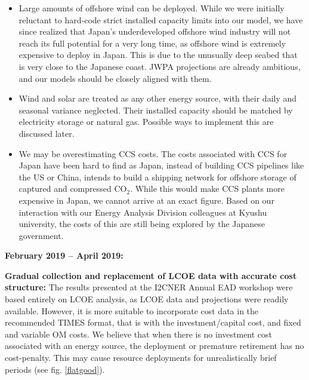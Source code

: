 \documentclass[14pt,a4paper]{article} %
\begin{document}
\begin{itemize}

\item Large amounts of offshore wind can be deployed. While we were initially reluctant to hard-code strict installed  capacity limits into our model, we have since realized that Japan's underdeveloped offshore wind industry will not reach its full potential for a very long time, as offshore wind is extremely expensive to deploy in Japan. This is due to the unusually deep seabed that is very close to the Japanese coast. \gls{JWPA} projections \cite{heger_wind_2016} are already ambitious, and our models should be closely aligned with them.

\item \justify Wind and solar are treated as any other energy source, with their daily and seasonal variance neglected. Their installed capacity should be matched by electricity storage or natural gas. Possible ways to implement this are discussed later.

\item \justify We may be overestimating \gls{CCS} costs. The costs associated with \gls{CCS} for Japan have been hard to find as Japan, instead of building \gls{CCS} pipelines like the US or China, intends to build a shipping network for offshore storage of captured and compressed CO$_2$. While this would make \gls{CCS} plants more expensive in Japan, we cannot arrive at an exact figure. Based on our interaction with our Energy Analysis Division colleagues at Kyushu university, the costs of this are still being explored by the Japanese government.

\end{itemize}

\begin{flushleft}
\textbf{February 2019 – April 2019:}
\end{flushleft}

\textbf{Gradual collection and replacement of \gls{LCOE} data with accurate cost structure:} The results presented at the \gls{I2CNER} Annual \gls{EAD} workshop \cite{chaube_dynamic_2019} were based entirely on \gls{LCOE} analysis, as \gls{LCOE} data and projections were readily available. However, it is more suitable to incorporate cost data in the recommended \gls{TIMES} format, that is with the investment/capital cost, and fixed and variable \gls{OM} costs. We believe that when there is no investment cost associated with an energy source, the deployment or premature retirement has no cost-penalty. This may cause resource deployments for unrealistically brief periods (see fig. \ref{flatgood}).\\
\end{document}
